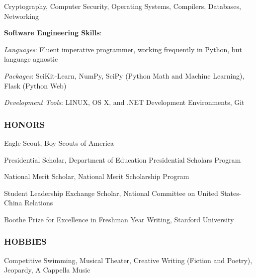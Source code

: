 \documentclass[11pt,letterpaper]{article}%
\begin{document}
\hspace{2.4em}
Cryptography, 
Computer Security,
Operating Systems,
Compilers,
Databases,
Networking


\hspace{.6em}
\textbf{Software Engineering Skills}:

\hspace{2.4em} 
\textit{Languages}: 
Fluent imperative programmer, working frequently in Python, but language agnostic 

\hspace{2.4em} 
\textit{Packages}: 
SciKit-Learn, NumPy, SciPy (Python Math and Machine Learning), Flask (Python Web)

\hspace{2.4em} 
\textit{Development Tools}: 
LINUX, OS X, and .NET Development Environments, Git

\vspace{.4em}
\subsubsection*{HONORS}
\vspace{-2ex}
\hrulefill
\vspace{-1.5ex}

\begin{itemize*}
\item Eagle Scout, Boy Scouts of America
\item Presidential Scholar, Department of Education Presidential Scholars Program
\item National Merit Scholar, National Merit Scholarship Program
\item Student Leadership Exchange Scholar, National Committee on United States-China Relations
\item Boothe Prize for Excellence in Freshman Year Writing, Stanford University
\end{itemize*}

\vspace{-.4em}
\subsubsection*{HOBBIES}
\vspace{-2ex}
\hrulefill

\hspace{.6em}
Competitive Swimming, Musical Theater, Creative Writing (Fiction and Poetry), Jeopardy, A Cappella Music

\vspace{-.6em}
\end{document}
